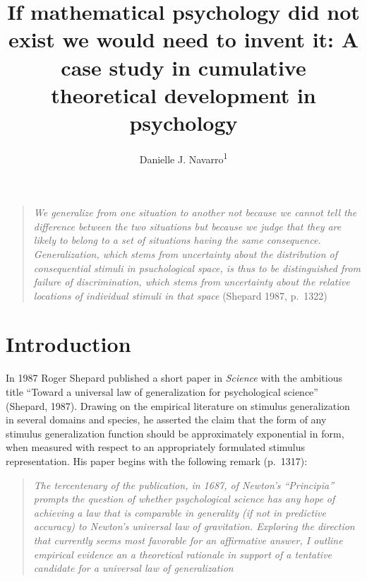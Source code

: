\documentclass[english,doc]{apa6}
\author{Danielle J. Navarro\textsuperscript{1}}
\affiliation{
\vspace{0.5cm}
\textsuperscript{1} School of Psychology, University of New South Wales}
\title{If mathematical psychology did not exist we would need to invent it: A case study in cumulative theoretical development in psychology}
\date{}
\begin{document}
\maketitle

\newpage

\begin{quote}
\emph{We generalize from one situation to another not because we cannot tell the difference between the two situations but because we judge that they are likely to belong to a set of situations having the same consequence. Generalization, which stems from uncertainty about the distribution of consequential stimuli in psuchological space, is thus to be distinguished from failure of discrimination, which stems from uncertainty about the relative locations of individual stimuli in that space} (Shepard 1987, p.~1322)
\end{quote}

\vspace*{12pt}

\hypertarget{introduction}{%
\section{Introduction}\label{introduction}}

\noindent
In 1987 Roger Shepard published a short paper in \emph{Science} with the ambitious title \enquote{Toward a universal law of generalization for psychological science} (Shepard, 1987). Drawing on the empirical literature on stimulus generalization in several domains and species, he asserted the claim that the form of any stimulus generalization function should be approximately exponential in form, when measured with respect to an appropriately formulated stimulus representation. His paper begins with the following remark (p.~1317):

\begin{quote}
\emph{The tercentenary of the publication, in 1687, of Newton's \enquote{Principia} prompts the question of whether psychological science has any hope of achieving a law that is comparable in generality (if not in predictive accuracy) to Newton's universal law of gravitation. Exploring the direction that currently seems most favorable for an affirmative answer, I outline empirical evidence an a theoretical rationale in support of a tentative candidate for a universal law of generalization}
\end{quote}
\end{document}
